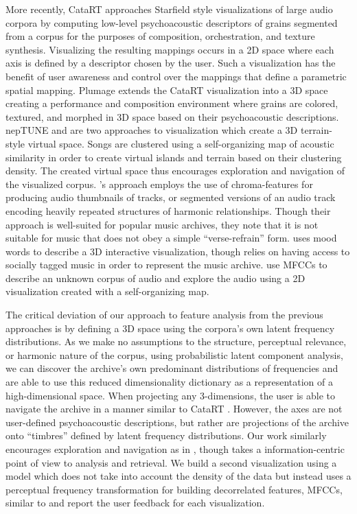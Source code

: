 \documentclass[a4paper,10pt,final]{ThesisStyle}
\begin{document}
More recently, CataRT \cite{Schwarz2008} approaches Starfield style visualizations of large audio corpora by computing low-level psychoacoustic descriptors of grains segmented from a corpus for the purposes of composition, orchestration, and texture synthesis.  Visualizing the resulting mappings occurs in a 2D space where each axis is defined by a descriptor chosen by the user.  Such a visualization has the benefit of user awareness and control over the mappings that define a parametric spatial mapping.  Plumage \cite{Schwarz2008} extends the CataRT visualization into a 3D space creating a performance and composition environment where grains are colored, textured, and morphed in 3D space based on their psychoacoustic descriptions.  nepTUNE \cite{Knees2006} and \cite{Dominik2009} are two approaches to visualization which create a 3D terrain-style virtual space.  Songs are clustered using a self-organizing map of acoustic similarity in order to create virtual islands and terrain based on their clustering density.  The created virtual space thus encourages exploration and navigation of the visualized corpus.  \cite{Bartsch2001}'s approach employs the use of chroma-features for producing audio thumbnails of tracks, or segmented versions of an audio track encoding heavily repeated structures of harmonic relationships.  Though their approach is well-suited for popular music archives, they note that it is not suitable for music that does not obey a simple ``verse-refrain'' form.  \cite{Stewart2008} uses mood words to describe a 3D interactive visualization, though relies on having access to socially tagged music in order to represent the music archive.  \cite{Heise2012} use MFCCs to describe an unknown corpus of audio and explore the audio using a 2D visualization created with a self-organizing map.

The critical deviation of our approach to feature analysis from the previous approaches is by defining a 3D space using the corpora's own latent frequency distributions.  As we make no assumptions to the structure, perceptual relevance, or harmonic nature of the corpus, using probabilistic latent component analysis, we can discover the archive's own predominant distributions of frequencies and are able to use this reduced dimensionality dictionary as a representation of a high-dimensional space.  When projecting any 3-dimensions, the user is able to navigate the archive in a manner similar to CataRT \cite{Schwarz2008}. However, the axes are not user-defined psychoacoustic descriptions, but rather are projections of the archive onto ``timbres'' defined by latent frequency distributions.  Our work similarly encourages exploration and navigation as in  \cite{Knees2006,Dominik2009,Heise2012}, though takes a information-centric point of view to analysis and retrieval.   We build a second visualization using a model which does not take into account the density of the data but instead uses a perceptual frequency transformation for building decorrelated features, MFCCs, similar to \cite{Heise2012} and report the user feedback for each visualization.
\end{document}
